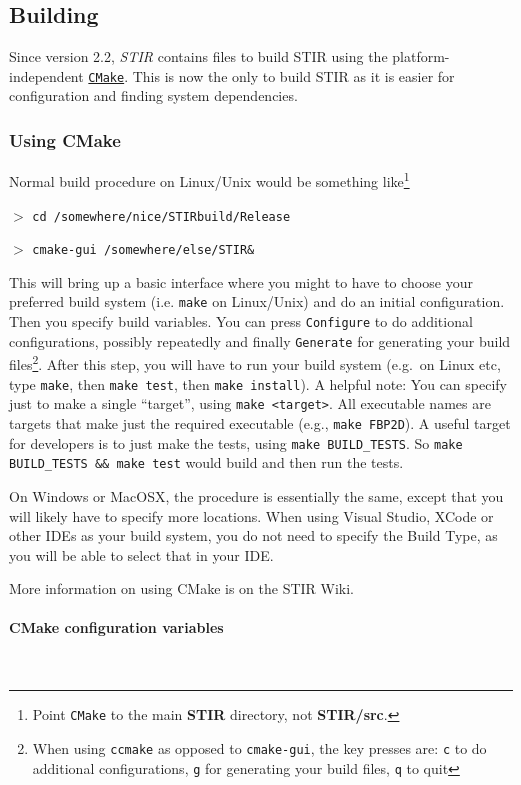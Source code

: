 \documentclass{article}
\def\url#1#2{\mbox{\href{#1}{\tt #2}}}
\newcommand{\subsubsubsection}[1]{\paragraph{#1}\mbox{} \\}
\newcommand{\cmdline}[1]{\par \noindent $>$ \texttt{#1}\par}
\begin{document}
\subsection{
Building}
Since version 2.2, \textit{STIR} contains files to build STIR using the platform-independent
\url{"http://www.cmake.org"}{CMake}. This is now the only to build STIR as
it is easier for configuration and finding system dependencies.
\subsubsection{
Using CMake}
\label{sec:UsingCMake}

Normal build procedure on Linux/Unix would be something like\footnote{Point \texttt{CMake} to the main \textbf{STIR}
directory, not \textbf{STIR/src}.}

\cmdline{cd /somewhere/nice/STIRbuild/Release}
\cmdline{cmake-gui /somewhere/else/STIR\&}

This will bring up a basic interface where you might to have to choose your preferred
build system (i.e. \texttt{make} on Linux/Unix) and do an initial configuration. Then 
you specify build variables. You can press \texttt{Configure} to do additional configurations,
possibly repeatedly and finally \texttt{Generate} for generating your build files\footnote{
When using \texttt{ccmake} as opposed to \texttt{cmake-gui}, the key presses are:
\texttt{c} to do additional configurations, \texttt{g} for generating
your build files, \texttt{q} to quit}. After this step, you will have to run your build system (e.g.\ on Linux etc,
type \texttt{make}, then \texttt{make test}, then \texttt{make install}).
A helpful note: You can specify just to make a single ``target'',
using \texttt{make <target>}. All executable names are targets that
make just the required executable (e.g., \texttt{make FBP2D}). A
useful target for developers is to just make the tests, using
\texttt{make BUILD\_TESTS}. So \texttt{make BUILD\_TESTS && make test}
would build and then run the tests.

On Windows or MacOSX, the procedure is essentially the same, except that you will likely have
to specify more locations. When using Visual Studio, XCode or other IDEs as  your build system,
you do not need to specify the Build Type, as you will be able to select that in
your IDE.

More information on using CMake is on the STIR Wiki.

{\subsubsubsection{CMake configuration variables}
}
\end{document}
